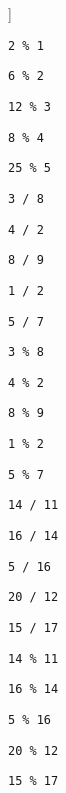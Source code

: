 \begin{exercise}
\begin{sltasks}[counter-format=1.tsk[1]]
\begin{items}
    \end{items}
    \task
    \begin{items}
        \item \texttt{2 \% 1}
        \item \texttt{6 \% 2}
        \item \texttt{12 \% 3}
        \item \texttt{8 \% 4}
        \item \texttt{25 \% 5}
    \end{items}
    \task
    \begin{items}
        \item \texttt{3 / 8}
        \item \texttt{4 / 2}
        \item \texttt{8 / 9}
        \item \texttt{1 / 2}
        \item \texttt{5 / 7}
    \end{items}
    \task
    \begin{items}
        \item \texttt{3 \% 8}
        \item \texttt{4 \% 2}
        \item \texttt{8 \% 9}
        \item \texttt{1 \% 2}
        \item \texttt{5 \% 7}
    \end{items}
    \task
    \begin{items}
        \item \texttt{14 / 11}
        \item \texttt{16 / 14}
        \item \texttt{5 / 16}
        \item \texttt{20 / 12}
        \item \texttt{15 / 17}
    \end{items}
    \task
    \begin{items}
        \item \texttt{14 \% 11}
        \item \texttt{16 \% 14}
        \item \texttt{5 \% 16}
        \item \texttt{20 \% 12}
        \item \texttt{15 \% 17}
    \end{items}
\end{sltasks}
\end{exercise}

